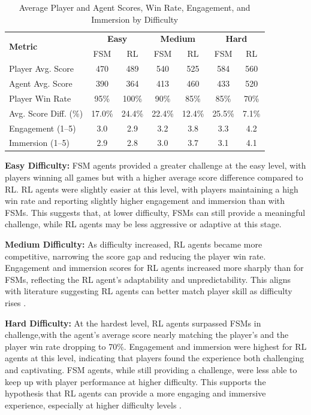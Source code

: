 \documentclass[conference]{IEEEtran}
\begin{document}
\begin{table}[h]
\centering
\caption{Average Player and Agent Scores, Win Rate, Engagement, and Immersion by Difficulty}
\label{tab:results}
\begin{tabular}{lcccccc}
\hline
\multirow{2}{*}{\textbf{Metric}} & \multicolumn{2}{c}{\textbf{Easy}} & \multicolumn{2}{c}{\textbf{Medium}} & \multicolumn{2}{c}{\textbf{Hard}} \\
 & FSM & RL & FSM & RL & FSM & RL \\
\hline
Player Avg. Score         & 470 & 489 & 540 & 525 & 584 & 560 \\
Agent Avg. Score          & 390 & 364 & 413 & 460 & 433 & 520 \\
Player Win Rate           & 95\% & 100\% & 90\% & 85\% & 85\% & 70\% \\
Avg. Score Diff. (\%)     & 17.0\% & 24.4\% & 22.4\% & 12.4\% & 25.5\% & 7.1\% \\
Engagement (1–5)          & 3.0 & 2.9 & 3.2 & 3.8 & 3.3 & 4.2 \\
Immersion (1–5)           & 2.9 & 2.8 & 3.0 & 3.7 & 3.1 & 4.1 \\
\hline
\end{tabular}
\end{table}

\textbf{Easy Difficulty:}  
FSM agents provided a greater challenge at the easy level, with players winning all games but with a higher average score difference compared to RL. RL agents were slightly easier at this level,
with players maintaining a high win rate and reporting slightly higher engagement and immersion than with FSMs. This suggests that, at lower difficulty, FSMs can still provide a meaningful challenge,
while RL agents may be less aggressive or adaptive at this stage.

\textbf{Medium Difficulty:}  
As difficulty increased, RL agents became more competitive, narrowing the score gap and reducing the player win rate. Engagement and immersion scores for RL agents increased more sharply than for FSMs,
reflecting the RL agent's adaptability and unpredictability. This aligns with literature suggesting RL agents can better match player skill as difficulty rises \cite{grech_creating_2023}.

\textbf{Hard Difficulty:}  
At the hardest level, RL agents surpassed FSMs in challenge,with the agent's average score nearly matching the player's and the player win rate dropping to 70\%.
Engagement and immersion were highest for RL agents at this level, indicating that players found the experience both challenging and captivating.
FSM agents, while still providing a challenge, were less able to keep up with player performance at higher difficulty.
This supports the hypothesis that RL agents can provide a more engaging and immersive experience, especially at higher difficulty levels \cite{vinyals_grandmaster_2019}.
\end{document}
